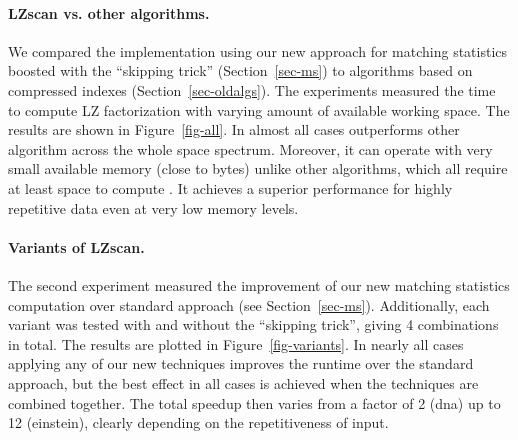 \documentclass[runningheads]{llncs}
\begin{document}
{\paragraph{LZscan vs. other algorithms.} We compared the 
implementation using our new approach for matching statistics boosted
with the ``skipping trick'' (Section~\ref{sec-ms}) to algorithms based
on compressed indexes (Section~\ref{sec-oldalgs}). The experiments measured
the time to compute LZ factorization with varying amount of available
working space. The results are shown in Figure~\ref{fig-all}. In almost
all cases  outperforms other algorithm across the whole space
spectrum. Moreover, it can operate with very small available memory (close
to  bytes) unlike other algorithms, which all require at least  space
to compute . It achieves a superior performance for highly
repetitive data even at very low memory levels.

\paragraph{Variants of LZscan.}
The second experiment measured the improvement of our new matching
statistics computation over standard approach (see Section~\ref{sec-ms}).
Additionally, each variant was tested with and without the ``skipping trick'',
giving 4 combinations in total. The results are plotted in
Figure~\ref{fig-variants}. In nearly all cases applying any of our new
techniques improves the runtime over the standard approach, but the best
effect in all cases is achieved when the techniques are combined together.
The total speedup then varies from a factor of 2 (dna) up to 12 (einstein),
clearly depending on the repetitiveness of input.

}
\end{document}
